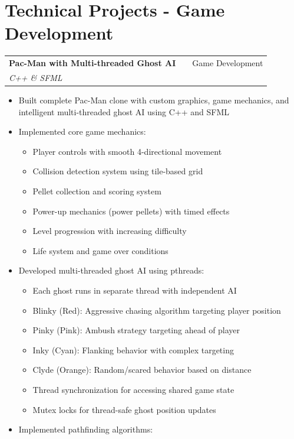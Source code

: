 \documentclass[a4paper,12pt]{article}
\makeatletter
\newenvironment{projectdetailed}[3]
    {
    \begin{tabularx}{\linewidth}{@{}l X r@{}}
    \textbf{#1} & \hfill & #2 \\
    \textit{#3} & & \\[3.75pt]
    \end{tabularx}
    \begin{minipage}[t]{\linewidth}
    \begin{itemize}[nosep,after=\strut, leftmargin=1em, itemsep=2pt,label=--]
    }
    {
    \end{itemize}
    \end{minipage}
    \vspace{6pt}
    }
\makeatother
\begin{document}
\section{Technical Projects - Game Development}

\begin{projectdetailed}{Pac-Man with Multi-threaded Ghost AI}{Game Development}{C++ \& SFML}
\item Built complete Pac-Man clone with custom graphics, game mechanics, and intelligent multi-threaded ghost AI using C++ and SFML
\item Implemented core game mechanics:
\begin{itemize}[nosep, leftmargin=2em]
    \item Player controls with smooth 4-directional movement
    \item Collision detection system using tile-based grid
    \item Pellet collection and scoring system
    \item Power-up mechanics (power pellets) with timed effects
    \item Level progression with increasing difficulty
    \item Life system and game over conditions
\end{itemize}
\item Developed multi-threaded ghost AI using pthreads:
\begin{itemize}[nosep, leftmargin=2em]
    \item Each ghost runs in separate thread with independent AI
    \item Blinky (Red): Aggressive chasing algorithm targeting player position
    \item Pinky (Pink): Ambush strategy targeting ahead of player
    \item Inky (Cyan): Flanking behavior with complex targeting
    \item Clyde (Orange): Random/scared behavior based on distance
    \item Thread synchronization for accessing shared game state
    \item Mutex locks for thread-safe ghost position updates
\end{itemize}
\item Implemented pathfinding algorithms:

\end{projectdetailed}
\end{document}
